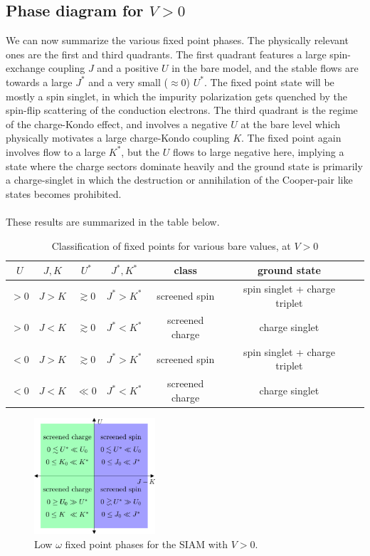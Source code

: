 \documentclass[twoside]{report}
\numberwithin{equation}{section}
\begin{document}
\subsection{Phase diagram for \(V > 0\)}
We can now summarize the various fixed point phases. The physically relevant ones are the first and third quadrants. The first quadrant features a large spin-exchange coupling \(J\) and a positive \(U\) in the bare model, and the stable flows are towards a large \(J^*\) and a very small (\(\approx 0\)) \(U^*\). The fixed point state will be mostly a spin singlet, in which the impurity polarization gets quenched by the spin-flip scattering of the conduction electrons. The third quadrant is the regime of the charge-Kondo effect, and involves a negative \(U\) at the bare level which physically motivates a large charge-Kondo coupling \(K\). The fixed point again involves flow to a large \(K^*\), but the \(U\) flows to large negative here, implying a state where the charge sectors dominate heavily and the ground state is primarily a charge-singlet in which the destruction or annihilation of the Cooper-pair like states becomes prohibited.
\\\\These results are summarized in the table below.
\begin{table}[htpb]
\centering
\begin{tabular}{|c|c|c|c|c|c|c|}
\hline
\(U \) & \(J,K \) & \(U^*\) &\(J^*,K^*\) & class & ground state \\
\hline
\(>0\)& \(J > K\)& \(\gtrsim 0\)&\(J^*>K^*\) & screened spin & spin singlet + charge triplet\\
\(>0\)& \(J < K\)& \(\gtrsim 0\) &\(J^*<K^*\) & screened charge & charge singlet\\
\(<0\)& \(J > K\)& \(\gtrsim 0\) &\(J^*>K^*\) & screened spin & spin singlet + charge triplet\\
\(<0\)& \(J < K\)& \(\ll 0\)&\(J^*<K^*\) & screened charge & charge singlet\\
\hline
\end{tabular}
\caption{Classification of fixed points for various bare values, at \(V > 0\)}
\end{table}

\begin{figure}[htpb!]
	\centering
	\includegraphics[width=0.4\textwidth]{../figures/phases_V.png}
	\caption{Low \(\omega\) fixed point phases for the SIAM with \(V>0\).}
\end{figure}
\end{document}

